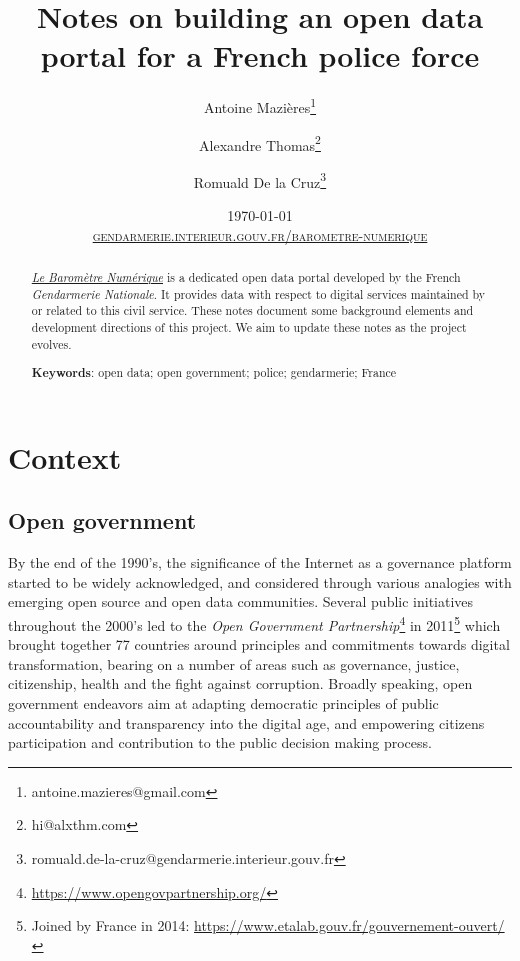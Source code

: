 \documentclass[11pt,a4paper,twocolumn,USenglish]{article}
\title{Notes on building an open data portal for a French police force}
\author[1,2]{Antoine Mazi\`eres\thanks{antoine.mazieres@gmail.com}}
\author[1,2]{Alexandre Thomas\thanks{hi@alxthm.com}}
\author[1,2]{Romuald De la Cruz\thanks{romuald.de-la-cruz@gendarmerie.interieur.gouv.fr}}
\affil[1]{Gendarmerie Nationale, General Directorate (\textsc{dggn}), Issy-les-Moulineaux, France.}
\affil[2]{Public Interest Entrepreneurs program (\textsc{eig}), Interministerial Directorate of Digital Affairs (\textsc{dinum}), Paris, France.}
\date{
\monthyeardate\today\\ \vspace{.5cm}
\href{https://www.gendarmerie.interieur.gouv.fr/barometre-numerique/}{\small{\textsc{gendarmerie.interieur.gouv.fr/barometre-numerique}}}
}
\begin{document}
\hypersetup{linkcolor= MidnightBlue,citecolor= MidnightBlue,filecolor=black,urlcolor= MidnightBlue}


\maketitle

\begin{abstract}

\href{https://www.gendarmerie.interieur.gouv.fr/barometre-numerique/}{\emph{Le Baromètre Numérique}} is a dedicated open data portal developed by the French \emph{Gendarmerie Nationale}. It provides data with respect to digital services maintained by or related to this civil service. These notes document some background elements and development directions of this project.  We aim to update these notes as the project evolves.

\vspace{1em}
\textbf{Keywords}: open data; open government; police; gendarmerie; France\vspace{1em}

\end{abstract}


\section*{Context}

\subsection*{Open government}

By the end of the 1990's, the significance of the Internet as a governance platform started to be widely acknowledged, and considered through various analogies with emerging open source and open data communities. Several public initiatives throughout the 2000's led to the \emph{Open Government Partnership}\footnote{\url{https://www.opengovpartnership.org/}} in 2011\footnote{Joined by France in 2014: \url{https://www.etalab.gouv.fr/gouvernement-ouvert/}} which brought together 77 countries around principles and commitments towards digital transformation, bearing on a number of areas such as governance, justice, citizenship, health and the fight against corruption. Broadly speaking, open government endeavors aim at adapting democratic principles of public accountability and transparency into the digital age, and empowering citizens participation and contribution to the public decision making process.
\end{document}
